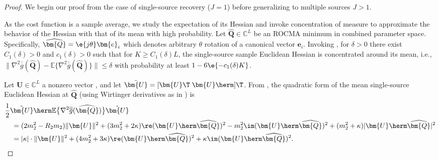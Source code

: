 \begin{proof}
	We begin our proof from the case of single-source recovery ($J=1$) before
	generalizing to multiple sources $J>1$.
	
	As the cost function is a sample average, we study the expectation of its Hessian and invoke concentration of measure to approximate the behavior of the Hessian with that of its mean with high probability.
	Let $\widehat{\bm{Q}}\in\mathbb{C}^L$ be an ROCMA minimum in combined parameter space.
	Specifically, $\widehat{\bm{Q}}=\e{j\theta}\bm{e}_{i}$ which denotes arbitrary
	$\theta$ rotation of a canonical vector $\bm{e}_{i}$.
	Invoking \cite[Lemma 1]{Feres2019wfcma}, for $\delta>0$ there exist $C_1(\delta)>0$ and $c_1(\delta)>0$ such that for $K\geq C_1(\delta)L$, the single-source sample Euclidean Hessian is concentrated around its mean, i.e., $\big\|\nabla^2 \overline{\overline{g}}(\widehat{\bm{Q}})-\mathbb{E}\big\{\nabla^2 \overline{\overline{g}}(\widehat{\bm{Q}})\}\big\|\leq\delta$ with probability at least $1-6\e{-c_1(\delta)K}$.
	
	Let $\bm{U}\in\mathbb{C}^L$ a nonzero vector
	, and let $\tilde{\bm{U}}=[\bm{U}\T\;\bm{U}\herm]\T$. %
	From \cite{Feres2021WFCMA}, 
	the quadratic form of the mean single-source Euclidean Hessian at $\widehat{\bm{Q}}$ (using Wirtinger derivatives as in \cite{Kreutz2008trustregionscma}) is
	\begin{align}
		&\frac{1}{2}
		\tilde{\bm{U}}
		\herm
		\mathbb{E}\big\{\nabla^2 \overline{\overline{g}}(\widehat{\bm{Q}})\big\}
		\tilde{\bm{U}}
	\nonumber\\&\quad
		= (2m_2^2-R_2m_2)\|\bm{U}\|^2 +(3m_2^2+2\kappa)\re(\bm{U}\herm\widehat{\bm{Q}})^2
		-m_2^2\im(\bm{U}\herm\widehat{\bm{Q}})^2+ (m_2^2+\kappa)|\bm{U}\herm\widehat{\bm{Q}}|^2\nonumber\\
		&\quad= |\kappa|\cdot\|\bm{U}\|^2 +(4m_2^2+3\kappa)\re(\bm{U}\herm\widehat{\bm{Q}})^2
		+\kappa\im(\bm{U}\herm\widehat{\bm{Q}})^2.\label{rocma:eqn:expectation_euclidean_hessian}
	\end{align}


\end{proof}
